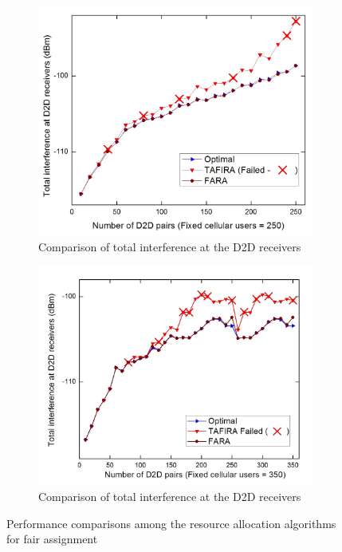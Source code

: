 \documentclass{ieeeaccess}
\begin{document}
\begin{figure}
{\begin{multicols}{2}
\begin{subfigure}{.86\linewidth}
	\includegraphics[width=\linewidth]{Graph/inter_d2d_fara.jpg}\par
	\caption{Comparison of total interference at the D2D receivers}
	\label{fig:inter_d2d_fair}
	\end{subfigure}
	
	\hspace{12pt}
	\begin{subfigure}{.86\linewidth}
	\includegraphics[width=\linewidth]{Graph/inter_d2d_fara_350.jpg}\par
	\caption{Comparison of total interference at the D2D receivers}
	\label{fig:inter_d2d_fair_350}
	\end{subfigure}
	\end{multicols}

}%
\caption{Performance comparisons among the resource allocation algorithms for fair assignment}
\label{fig:fair}
\end{figure}
\end{document}
